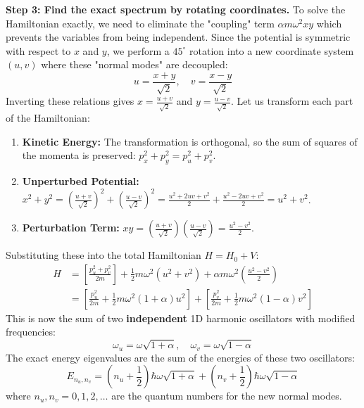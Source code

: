 \begin{solution}
\textbf{Step 3: Find the exact spectrum by rotating coordinates.}
To solve the Hamiltonian exactly, we need to eliminate the "coupling" term $\alpha m\omega^2 xy$ which prevents the variables from being independent. Since the potential is symmetric with respect to $x$ and $y$, we perform a $45^\circ$ rotation into a new coordinate system $(u, v)$ where these "normal modes" are decoupled:
\begin{equation*}
    u = \frac{x + y}{\sqrt{2}}, \quad v = \frac{x - y}{\sqrt{2}}
\end{equation*}
Inverting these relations gives $x = \frac{u+v}{\sqrt{2}}$ and $y = \frac{u-v}{\sqrt{2}}$. Let us transform each part of the Hamiltonian:
\begin{enumerate}
    \item \textbf{Kinetic Energy:} The transformation is orthogonal, so the sum of squares of the momenta is preserved: $p_x^2 + p_y^2 = p_u^2 + p_v^2$.
    \item \textbf{Unperturbed Potential:} $x^2 + y^2 = \left(\frac{u+v}{\sqrt{2}}\right)^2 + \left(\frac{u-v}{\sqrt{2}}\right)^2 = \frac{u^2 + 2uv + v^2}{2} + \frac{u^2 - 2uv + v^2}{2} = u^2 + v^2$.
    \item \textbf{Perturbation Term:} $xy = \left(\frac{u+v}{\sqrt{2}}\right)\left(\frac{u-v}{\sqrt{2}}\right) = \frac{u^2 - v^2}{2}$.
\end{enumerate}
Substituting these into the total Hamiltonian $H = H_0 + V$:
\begin{align*}
    H &= \left[ \frac{p_u^2 + p_v^2}{2m} \right] + \frac{1}{2}m\omega^2(u^2 + v^2) + \alpha m\omega^2 \left( \frac{u^2 - v^2}{2} \right) \\
      &= \left[ \frac{p_u^2}{2m} + \frac{1}{2}m\omega^2(1+\alpha)u^2 \right] + \left[ \frac{p_v^2}{2m} + \frac{1}{2}m\omega^2(1-\alpha)v^2 \right]
\end{align*}
This is now the sum of two \textbf{independent} 1D harmonic oscillators with modified frequencies:
\begin{equation*}
    \omega_u = \omega\sqrt{1+\alpha}, \quad \omega_v = \omega\sqrt{1-\alpha}
\end{equation*}
The exact energy eigenvalues are the sum of the energies of these two oscillators:
\begin{equation*}
    E_{n_u, n_v} = \left( n_u + \frac{1}{2} \right) \hbar\omega\sqrt{1+\alpha} + \left( n_v + \frac{1}{2} \right) \hbar\omega\sqrt{1-\alpha}
\end{equation*}
where $n_u, n_v = 0, 1, 2, \dots$ are the quantum numbers for the new normal modes.


\end{solution}
